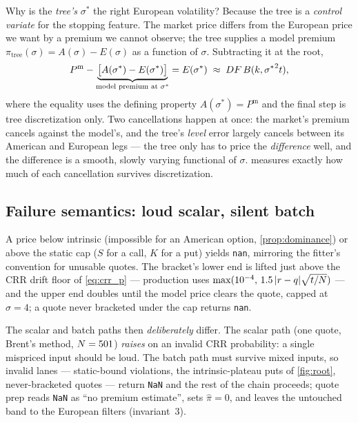 \documentclass[11pt]{article}
\begin{document}
\begin{heuristic}
Why is the \emph{tree's} $\sigma^*$ the right European volatility?
Because the tree is a \emph{control variate} for the stopping feature.
The market price differs from the European price we want by a premium we
cannot observe; the tree supplies a model premium
$\pi_{\mathrm{tree}}(\sigma)=A(\sigma)-E(\sigma)$ as a function of
$\sigma$.  Subtracting it at the root,
\begin{equation}
P^{\mathrm m}
-\underbrace{\big[A(\sigma^*)-E(\sigma^*)\big]}_{\text{model premium at }\sigma^*}
= E(\sigma^*)\;\approx\;DF\,B(k,{\sigma^*}^2t),
\label{eq:cv}
\end{equation}
where the equality uses the defining property
$A(\sigma^*)=P^{\mathrm m}$ and the final step is tree discretization
only.  Two cancellations happen at once: the market's premium cancels
against the model's, and the tree's \emph{level} error largely cancels
between its American and European legs --- the tree only has to price the
\emph{difference} well, and the difference is a smooth, slowly varying
functional of $\sigma$.   measures exactly how much of
each cancellation survives discretization.
\end{heuristic}

\subsection{Failure semantics: loud scalar, silent batch}
\label{sec:failure}

A price below intrinsic (impossible for an American option,
\cref{prop:dominance}) or above the static cap ($S$ for a call, $K$ for a
put) yields \texttt{nan}, mirroring the fitter's convention for unusable
quotes.  The bracket's lower end is lifted just above the CRR drift floor
of \cref{eq:crr_p} --- production uses
$\max(10^{-4},\,1.5\,\lvert r-q\rvert\sqrt{t/N})$ --- and the upper end doubles
until the model price clears the quote, capped at $\sigma=4$; a quote
never bracketed under the cap returns \texttt{nan}.

The scalar and batch paths then \emph{deliberately} differ.  The scalar
path (one quote, Brent's method, $N=501$) \emph{raises} on
an invalid CRR probability: a single mispriced input should be loud.  The
batch path must survive mixed inputs, so invalid lanes --- static-bound
violations, the intrinsic-plateau puts of \cref{fig:root}, never-bracketed
quotes --- return \texttt{NaN} and the rest of the chain proceeds; quote
prep reads \texttt{NaN} as ``no premium estimate'', sets $\hat\pi=0$, and
leaves the untouched band to the European filters (invariant~3).
\end{document}

